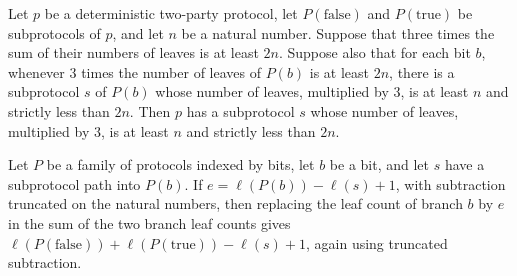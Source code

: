 \begin{lemma}
\label{CommunicationComplexity.Deterministic.Protocol.balanced_children}
\leanok
{}
Let $p$ be a deterministic two-party protocol, let $P(\mathrm{false})$ and
$P(\mathrm{true})$ be subprotocols of $p$, and let $n$ be a natural number. Suppose that
three times the sum of their numbers of leaves is at least $2n$. Suppose also that for
each bit $b$, whenever $3$ times the number of leaves of $P(b)$ is at least $2n$, there
is a subprotocol $s$ of $P(b)$ whose number of leaves, multiplied by $3$, is at least
$n$ and strictly less than $2n$. Then $p$ has a subprotocol $s$ whose number of leaves,
multiplied by $3$, is at least $n$ and strictly less than $2n$.
\end{lemma}

\begin{lemma}
\label{CommunicationComplexity.Deterministic.Protocol.erasePath_numLeaves_step}
\leanok
{}
Let $P$ be a family of protocols indexed by bits, let $b$ be a bit, and let $s$ have a
subprotocol path into $P(b)$. If $e=\ell(P(b))-\ell(s)+1$, with subtraction truncated on
the natural numbers, then replacing the leaf count of branch $b$ by $e$ in the sum of
the two branch leaf counts gives
$\ell(P(\mathrm{false}))+\ell(P(\mathrm{true}))-\ell(s)+1$, again using truncated
subtraction.
\end{lemma}

